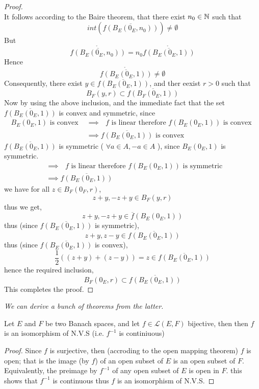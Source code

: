 \begin{proof}
\[\]
It follows according to the Baire theorem, that 
there exist $n_0 \in  \mathbb{N} $  such that 
\[
int(\overline{f(B_{E}(0_{E},n_0) ) }) \neq  \emptyset 
\]
But 
\[
	\mathring{\overline{f(B_{E}(0_{E},n_0) ) }} = 
	n_0 \mathring{\overline{f(B_{E}(0_{E},1) ) }} 
\]
Hence 
\[
\mathring{\overline{f(B_{E}(0_{E},1) ) }} \neq  \emptyset 
\]
Consequently, there exist $y \in \overline{f(B_{E}(0_{E},1) ) }$, 
and ther eexist $r > 0 $  such that 
\[
B_{F}(y,r)  \subset 
\overline{f(B_{F}(0_{E},1) ) } 
\]
Now by using the above inclusion, and the immediate fact that
the set $\overline{f(B_{E}(0_{E},1) ) } $ is convex and symmetric, 
since 
\begin{align*}
	B_{E}(0_{E},1)  \text{ is convex }  &\implies  \text{ $f$ is linear 
	therefore }  
f(B_{E}(0_{E},1) ) \text{ is convex }       \\
					    & \implies 
\overline{f(B_{E}(0_{E},1) ) } \text{ is convex } 
\end{align*}
$\overline{f(B_{E}(0_{E},1) ) } $  is symmetric ( $\forall  a \in A, 
-a \in  A$ ), since $B_{E}(0_{E},1)  $  is symmetric.
\begin{align*}
&\implies \text{ $f $ is linear therefore }  
f(B_{E}(0_{E},1) ) \text{ is symmetric }  \\
&\implies  \overline{f(B_{E}(0_{E},1) )  }
\end{align*}
we have for all $z \in  B_{F}(0_{F},r)  $, 
\[
z +y, -z+y \in  B_{F}(y,r) 
\]
thus we get,
\[
z + y, -z + y \in  
\overline{f}(B_{E}(0_{E},1) ) 
\]
thus (since $\overline{f(B_{E}(0_{E},1) ) } $  is symmetric),
\[
	z +y, z-y \in  \overline{f(B_{E}(0_{E},1) ) }
\]
thus (since $\overline{f(B_{E}(0_{E},1) ) } $ is convex), 
\[
\frac{1}{2}
\left( (z+y)  + (z-y)  \right) = 
z \in  
\overline{f(B_{E}(0_{E},1) ) } 
\]
hence the required inclusion, 
\[
B_{F}(0_{E},r)  \subset 
\overline{f(B_{E}(0_{E},1)) }
\]
This completes the proof.
\end{proof}
\begin{center}
	\it
	We can derive a bunch of theorems from the latter.
\normalfont
\end{center}
\begin{theorem}
	Let $E $ and $F $ be two Banach spaces, 
	and let $f \in \mathcal{L} (E,F)  $ bijective, then 
	then $f$  is an isomorphism of N.V.S (i.e. $f^{-1} $ is 
	continiuous) 
\end{theorem}
\begin{proof}
	Since $f $ is surjective, then (accroding to the open
	mapping theorem) $f $ is open; that is the image 
	(by $f $) of an open subset of $E $ is an open 
	subset of $F$.
	Equivalently, the preimage by $f^{-1} $  
	of any open subset of $E$ is open in $F$. 
	this shows that $f^{-1} $  is continuous thus 
	$f $ is an isomorphism of N.V.S. 
\end{proof}
